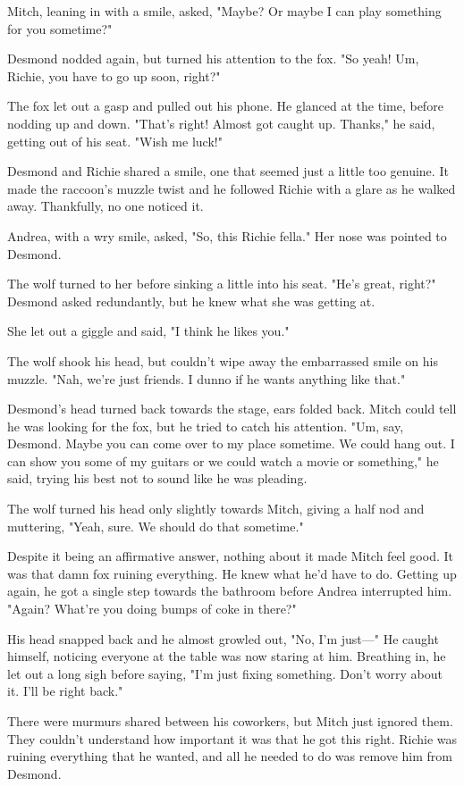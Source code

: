 Mitch, leaning in with a smile, asked, "Maybe? Or maybe I can play something for you sometime?"

Desmond nodded again, but turned his attention to the fox. "So yeah! Um, Richie, you have to go up soon, right?"

The fox let out a gasp and pulled out his phone. He glanced at the time, before nodding up and down. "That's right! Almost got caught up. Thanks," he said, getting out of his seat. "Wish me luck!"

Desmond and Richie shared a smile, one that seemed just a little too genuine. It made the raccoon's muzzle twist and he followed Richie with a glare as he walked away. Thankfully, no one noticed it.

Andrea, with a wry smile, asked, "So, this Richie fella." Her nose was pointed to Desmond.

The wolf turned to her before sinking a little into his seat. "He's great, right?" Desmond asked redundantly, but he knew what she was getting at.

She let out a giggle and said, "I think he likes you."

The wolf shook his head, but couldn't wipe away the embarrassed smile on his muzzle. "Nah, we're just friends. I dunno if he wants anything like that."

Desmond's head turned back towards the stage, ears folded back. Mitch could tell he was looking for the fox, but he tried to catch his attention. "Um, say, Desmond. Maybe you can come over to my place sometime. We could hang out. I can show you some of my guitars or we could watch a movie or something," he said, trying his best not to sound like he was pleading.

The wolf turned his head only slightly towards Mitch, giving a half nod and muttering, "Yeah, sure. We should do that sometime."

Despite it being an affirmative answer, nothing about it made Mitch feel good. It was that damn fox ruining everything. He knew what he'd have to do. Getting up again, he got a single step towards the bathroom before Andrea interrupted him. "Again? What're you doing bumps of coke in there?"

His head snapped back and he almost growled out, "No, I'm just---" He caught himself, noticing everyone at the table was now staring at him. Breathing in, he let out a long sigh before saying, "I'm just fixing something. Don't worry about it. I'll be right back."

There were murmurs shared between his coworkers, but Mitch just ignored them. They couldn't understand how important it was that he got this right. Richie was ruining everything that he wanted, and all he needed to do was remove him from Desmond.

